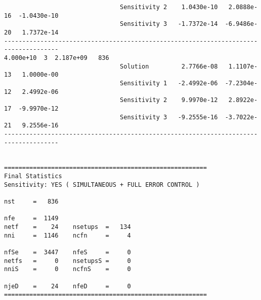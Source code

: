 \begin{verbatim}
                                Sensitivity 2    1.0430e-10   2.0888e-16  -1.0430e-10 
                                Sensitivity 3   -1.7372e-14  -6.9486e-20   1.7372e-14 
-------------------------------------------------------------------------------------
4.000e+10  3  2.187e+09   836
                                Solution         2.7766e-08   1.1107e-13   1.0000e-00 
                                Sensitivity 1   -2.4992e-06  -7.2304e-12   2.4992e-06 
                                Sensitivity 2    9.9970e-12   2.8922e-17  -9.9970e-12 
                                Sensitivity 3   -9.2555e-16  -3.7022e-21   9.2556e-16 
-------------------------------------------------------------------------------------


========================================================
Final Statistics
Sensitivity: YES ( SIMULTANEOUS + FULL ERROR CONTROL )

nst     =   836

nfe     =  1149
netf    =    24    nsetups  =   134
nni     =  1146    ncfn     =     4

nfSe    =  3447    nfeS     =     0
netfs   =     0    nsetupsS =     0
nniS    =     0    ncfnS    =     0

njeD    =    24    nfeD     =     0
========================================================
\end{verbatim}